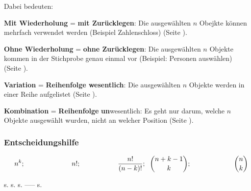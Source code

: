 Dabei bedeuten:

\textbf{Mit Wiederholung} = \textbf{mit Zurücklegen}: Die ausgewählten $n$ Obejkte können
mehrfach verwendet werden (Beispiel Zahlenschloss) (Seite \pageref{kombiVariation}).

\textbf{Ohne Wiederholung} = \textbf{ohne Zurücklegen}: Die ausgewählten $n$ Objekte kommen
in der Stichprobe genau einmal vor (Beispiel: Personen auswählen)
(Seite \pageref{kombiVariationOhneWiederholung}).

\textbf{Variation} = \textbf{Reihenfolge wesentlich}: Die ausgewählten $n$ Objekte werden in
einer Reihe aufgelistet (Seite \pageref{kombiVariation}).


\textbf{Kombination} = \textbf{Reihenfolge} \textbf{un}wesentlich: Es geht nur darum,
welche $n$ Objekte ausgewählt wurden, nicht an welcher Position (Seite \pageref{kombiKombination}).

\newpage
\subsubsection{Entscheidungshilfe}


$$\hspace{4mm}
n^k; \hspace{24mm}
n!; \hspace{19mm}
\frac{n!}{(n-k)!}; \hspace{2mm}
{n+k-1 \choose k};\hspace{22mm}
{n\choose k}$$

{\hspace{18mm}
s. \pageref{kombiVariationMitZuruecklegen}\hspace{19mm}
s. \pageref{kombiVariationOhneWiederholung}\hspace{19mm}
s. \pageref{kombiVariationEinerTeilmenge}\hspace{17mm}
 ----- \hspace{30mm}
s. \pageref{kombiKombination}
}
\newpage
